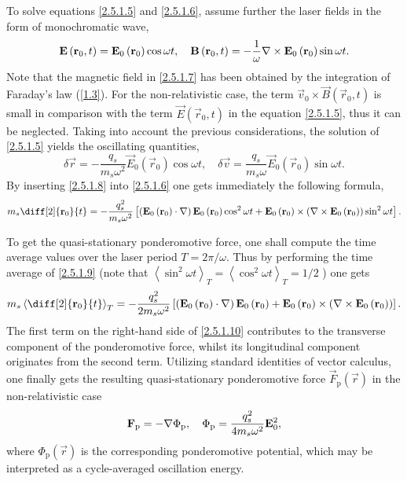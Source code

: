 To solve equations \ref{2.5.1.5} and \ref{2.5.1.6}, assume further the laser fields in the form of monochromatic wave, 
\begin{equation}
\label{2.5.1.7}
\mathbf{E}\left(\mathbf{r}_0, t\right) = \mathbf{E}_0 \left(\mathbf{r}_0 \right) \cos \omega t, \quad  \mathbf{B}\left(\mathbf{r}_0, t\right) = - \frac{1}{\omega} \nabla \times \mathbf{E}_0 \left(\mathbf{r}_0 \right) \sin \omega t.
\end{equation}
Note that the magnetic field in \ref{2.5.1.7} has been obtained by the integration of Faraday's law (\ref{1.3}). For the non-relativistic case, the term $ \vec{v}_0 \times \vec{B}\left(\vec{r}_0, t\right) $ is small in comparison with the term $ \vec{E}\left(\vec{r}_0, t\right) $ in the equation \ref{2.5.1.5}, thus it can be neglected. Taking into account the previous considerations, the solution of \ref{2.5.1.5} yields the oscillating quantities,
\begin{equation}
\label{2.5.1.8}
\delta \vec{r} = -\frac{q_s}{m_s \omega^2} \vec{E}_0 \left(\vec{r}_0 \right) \cos \omega t, \quad \delta \vec{v} = \frac{q_s}{m_s \omega} \vec{E}_0 \left(\vec{r}_0 \right) \sin \omega t.
\end{equation}
By inserting \ref{2.5.1.8} into \ref{2.5.1.6} one gets immediately the following formula,
\begin{equation}
\label{2.5.1.9}
m_s \diff[2]{\vec{r}_0}{t} = - \frac{q_s^{2}}{m_s \omega^2} \left[\left(\vec{E}_0 \left(\vec{r}_0 \right) \cdot \nabla \right) \vec{E}_0 \left(\vec{r}_0 \right) \cos^2 \omega t + \vec{E}_0 \left(\vec{r}_0 \right) \times \left( \nabla \times \vec{E}_0 \left(\vec{r}_0 \right) \right) \sin^2 \omega t \right].
\end{equation}

To get the quasi-stationary ponderomotive force, one shall compute the time average values over the laser period $ T = 2 \pi/ \omega $. Thus by performing the time average of \ref{2.5.1.9} (note that $ \left\langle \sin^2 \omega t \right\rangle_T = \left\langle \cos^2 \omega t \right\rangle_T = 1/2$ ) one gets
\begin{equation}
\label{2.5.1.10}
m_s \left\langle \diff[2]{\vec{r}_0}{t} \right\rangle_{T} = - \frac{q_s^{2}}{2 m_s \omega^2} \left[\left(\vec{E}_0 \left(\vec{r}_0 \right) \cdot \nabla \right) \vec{E}_0 \left(\vec{r}_0 \right) + \vec{E}_0 \left(\vec{r}_0 \right) \times \left( \nabla \times \vec{E}_0 \left(\vec{r}_0 \right) \right)\right].
\end{equation}
The first term on the right-hand side of \ref{2.5.1.10} contributes to the transverse component of the ponderomotive force, whilst its longitudinal component originates from the second term. Utilizing standard identities of vector calculus, one finally gets the resulting quasi-stationary ponderomotive force $ \vec{F}_{\mathrm{p}} \left( \vec{r} \right) $ in the non-relativistic case
\begin{equation}
\label{2.5.1.11}
\mathbf{F}_{\mathrm{p}} = - \nabla \Phi_{\mathrm{p}}, \quad \Phi_{\mathrm{p}} = \frac{q_s^{2}}{4 m_s \omega^2} \mathbf{E}_0^{2},
\end{equation}
where $ \Phi_{\mathrm{p}} \left( \vec{r} \right) $ is the corresponding ponderomotive potential, which may be interpreted as a cycle-averaged oscillation energy.

